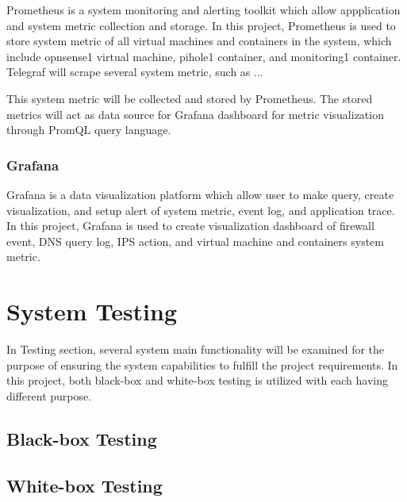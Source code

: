 \documentclass[../index.tex]{subfiles}
\begin{document}
Prometheus is a system monitoring and alerting toolkit which allow appplication and system metric
collection and storage. In this project, Prometheus is used to store system metric of all virtual
machines and containers in the system, which include opnsense1 virtual machine, pihole1 container,
and monitoring1 container. Telegraf will scrape several system metric, such as ...

This system metric  will be collected and stored by Prometheus. The stored metrics will act as data
source for Grafana dashboard for metric visualization through PromQL query language.

\subsubsection{Grafana}

Grafana is a data visualization platform which allow user to make query, create visualization, and
setup alert of system metric, event log, and application trace. In this project, Grafana is used to
create visualization dashboard of firewall event, DNS query log, IPS action, and virtual machine and
containers system metric.

\section{System Testing}

In Testing section, several system main functionality will be examined for the purpose of ensuring
the system capabilities to fulfill the project requirements. In this project, both black-box and
white-box testing is utilized with each having different purpose.

\subsection{Black-box Testing}

\subsection{White-box Testing}

\end{document}
